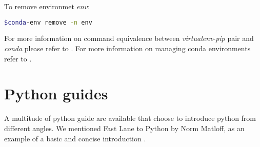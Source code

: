 \documentclass[article]{revtex4}
\begin{document}
\noindent To remove environmet $env$:
\begin{lstlisting}[language=bash]
$conda-env remove -n env
\end{lstlisting}

For more information on command equivalence between {\it virtualenv}-{\it pip} pair and {\it conda} please refer to \cite{cmp-venv-conda}.
For more information on managing conda environments refer to \cite{conda}.

\section{Python guides}
A multitude of python guide are available that choose to introduce python from different angles. We mentioned Fast Lane to Python by Norm Matloff, as an example of a basic and concise introduction \cite{fastlane}.


\end{document}
